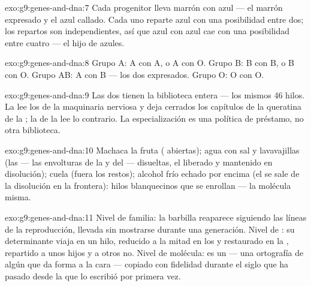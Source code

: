 \begin{solution}{exo:g9:genes-and-dna:7}
Cada progenitor lleva marrón con azul --- el marrón expresado y el azul
callado. Cada uno reparte azul con una posibilidad entre dos; los
repartos son independientes, así que azul con azul cae con una
posibilidad entre cuatro --- el hijo de  azules.
\end{solution}

\begin{solution}{exo:g9:genes-and-dna:8}
Grupo A: A con A, o A con O. Grupo B: B con B, o B con O. Grupo AB: A
con B --- los dos expresados. Grupo O: O con O.
\end{solution}

\begin{solution}{exo:g9:genes-and-dna:9}
Las dos tienen la biblioteca entera --- los mismos 46 hilos. La 
lee los  de la maquinaria nerviosa y deja cerrados los capítulos
de la queratina de la ; la  de la  lee lo contrario. La
especialización es una política de préstamo, no otra biblioteca.
\end{solution}

\begin{solution}{exo:g9:genes-and-dna:10}
Machaca la fruta ( abiertas); agua con sal y lavavajillas (las
 --- las envolturas de la  y del  --- disueltas,
el  liberado y mantenido en disolución); cuela (fuera los restos);
alcohol frío echado por encima (el  se sale de la disolución en la
frontera): hilos blanquecinos que se enrollan --- la molécula misma.
\end{solution}

\begin{solution}{exo:g9:genes-and-dna:11}
Nivel de familia: la barbilla reaparece siguiendo las líneas de la
reproducción, llevada sin mostrarse durante una generación. Nivel de
: su determinante viaja en un hilo, reducido a la mitad en los
 y restaurado en la , repartido a unos hijos y a
otros no. Nivel de molécula: es un  --- una ortografía de algún
 que da forma a la cara --- copiado con fidelidad durante el siglo
que ha pasado desde la  que lo escribió por primera vez.
\end{solution}

